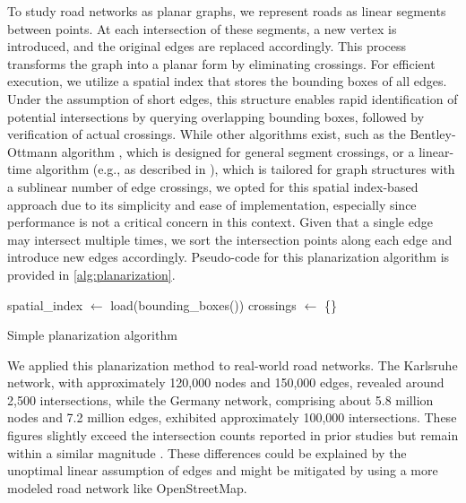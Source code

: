 To study road networks as planar graphs, we represent roads as linear segments
between points. At each intersection of these segments, a new vertex is
introduced, and the original edges are replaced accordingly. This process
transforms the graph into a planar form by eliminating crossings. For efficient
execution, we utilize a spatial index that stores the bounding boxes of all
edges. Under the assumption of short edges, this structure enables rapid
identification of potential intersections by querying overlapping bounding
boxes, followed by verification of actual crossings. While other algorithms
exist, such as the Bentley-Ottmann algorithm \cite{bentley_algorithms_1979},
which is designed for general segment crossings, or a linear-time algorithm
(e.g., as described in \cite{eppstein_linear-time_2010}), which is tailored for
graph structures with a sublinear number of edge crossings, we opted for this
spatial index-based approach due to its simplicity and ease of implementation,
especially since performance is not a critical concern in this context. Given
that a single edge may intersect multiple times, we sort the intersection
points along each edge and introduce new edges accordingly. Pseudo-code for
this planarization algorithm is provided in \cref{alg:planarization}.

\begin{algorithm}[b]
	\BlankLine
	spatial\_index \(\longleftarrow\) load(bounding\_boxes(\E))\;
	crossings \(\longleftarrow\) \{\}\;
	\caption{Simple planarization algorithm \label{alg:planarization}}
\end{algorithm}

We applied this planarization method to real-world road networks. The Karlsruhe
network, with approximately 120,000 nodes and 150,000 edges, revealed around
2,500 intersections, while the Germany network, comprising about 5.8 million
nodes and 7.2 million edges, exhibited approximately 100,000 intersections.
These figures slightly exceed the  intersection counts reported
in prior studies but remain within a similar magnitude
\cite{eppstein_linear-time_2010}. These differences could be explained by the
unoptimal linear assumption of edges and might be mitigated by using a more
modeled road network like OpenStreetMap.

